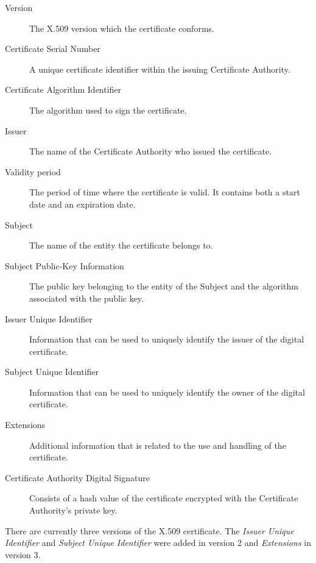 \documentclass[12pt,a4paper,titlepage]{report}
\begin{document}
\begin{description}
\item[Version] {The X.509 version which the certificate conforms. }
\item[Certificate Serial Number] {A unique certificate identifier within the issuing Certificate Authority. }
\item[Certificate Algorithm Identifier] {The algorithm used to sign the certificate. }
\item[Issuer] {The name of the Certificate Authority who issued the certificate. }
\item[Validity period] {The period of time where the certificate is valid. It contains both a start date and an expiration date. }
\item[Subject] {The name of the entity the certificate belongs to. }
\item[Subject Public-Key Information] {The public key belonging to the entity of the Subject and the algorithm associated with the public key.  }
\item[Issuer Unique Identifier] {Information that can be used to uniquely identify the issuer of the digital certificate. }
\item[Subject Unique Identifier] {Information that can be used to uniquely identify the owner of the digital certificate.}
\item[Extensions] {Additional information that is related to the use and handling of the certificate.}
\item[Certificate Authority Digital Signature] {Consists of a hash value of the certificate encrypted with the Certificate Authority's private key.}
\end{description}

There are currently three versions of the X.509 certificate. The \emph{Issuer Unique Identifier} and \emph{Subject Unique Identifier} were added in version 2 and \emph{Extensions} in version 3.
\end{document}

